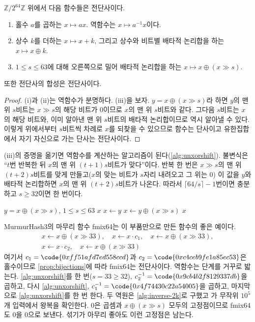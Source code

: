 \begin{proposition}
\label{prop:bijections}
$\mathbb{Z}/2^{64}\mathbb{Z}$ 위에서 다음 함수들은 전단사이다.
\begin{enumerate}
\item 홀수 $a$를 곱하는 $x\mapsto ax$. 역함수는 $x\mapsto a^{-1}x$이다.
\item 상수 $k$를 더하는 $x\mapsto x+k$, 그리고 상수와 비트별 배타적 논리합을 하는 $x\mapsto x\oplus k$.
\item $1\le s\le63$에 대해 오른쪽으로 밀어 배타적 논리합을 하는 $x\mapsto x\oplus(x\gg s)$.
\end{enumerate}
또한 전단사의 합성은 전단사이다.
\end{proposition}

\begin{proof}
(i)과 (ii)는 역함수가 분명하다. (iii)을 보자. $y=x\oplus(x\gg s)$라 하면 $y$의 맨 위 $s$비트는 $x\gg s$의 해당 비트가 $0$이므로 $x$의 맨 위 $s$비트와 같다. 그다음 $s$비트는 $x$의 해당 비트와, 이미 알아낸 맨 위 $s$비트의 배타적 논리합이므로 역시 알아낼 수 있다. 이렇게 위에서부터 $s$비트씩 차례로 $x$를 되찾을 수 있으므로 함수는 단사이고 유한집합에서 자기 자신으로 가는 단사는 전단사이다.
\end{proof}

(iii)의 증명을 옮기면 역함수를 계산하는 알고리즘이 된다(\cref{alg:unxorshift}). 불변식은 ``$t$번 반복한 뒤 $x$의 맨 위 $(t+1)s$비트가 맞다''이다. 반복 한 번은 $x\gg s$의 맨 위 $(t+2)s$비트를 맞게 만들고($x$의 맞는 비트가 $s$자리 내려오고 그 위는 $0$) 이 값을 $y$와 배타적 논리합하면 $x$의 맨 위 $(t+2)s$비트가 나온다. 따라서 $\lceil64/s\rceil-1$번이면 충분하고 $s\ge32$이면 한 번이다.

\begin{algorithm}[htbp]
\begin{algorithmic}[1]
\Require $y=x\oplus(x\gg s)$, $1\le s\le63$
\Ensure $x$
\State $x\gets y$ 
 $x\gets y\oplus(x\gg s)$ 
\EndFor
\State \Return $x$
\end{algorithmic}
\caption{오른쪽 밀기–배타적 논리합의 역함수}
\label{alg:unxorshift}
\end{algorithm}

MurmurHash3의 마무리 함수 fmix64는 이 부품만으로 만든 함수의 좋은 예이다\cite{appleby-smhasher}.
\begin{gather*}
x\gets x\oplus(x\gg33),\quad x\gets x\cdot c_1,\quad x\gets x\oplus(x\gg33),\\
x\gets x\cdot c_2,\quad x\gets x\oplus(x\gg33)
\end{gather*}
여기서 $c_1=\code{0xff51afd7ed558ccd}$과 $c_2=\code{0xc4ceb9fe1a85ec53}$은 홀수이므로 \cref{prop:bijections}에 따라 fmix64는 전단사이다. 역함수는 단계를 거꾸로 밟는다. \cref{alg:unxorshift}를 한 번($s=33\ge32$), $c_2^{-1}=\code{0x9cb4b2f8129337db}$을 곱하고, 다시 \cref{alg:unxorshift}, $c_1^{-1}=\code{0x4f74430c22a54005}$을 곱하고, 마지막으로 \cref{alg:unxorshift}를 한 번 한다. 두 역원은 \cref{alg:inverse-2k}로 구했고 가 무작위 $10^5$개 입력에서 왕복을 확인한다. $0$은 곱셈과 $x\oplus(x\gg s)$ 모두의 고정점이므로 fmix64도 $0$을 $0$으로 보낸다. 섞기가 아무리 좋아도 이런 고정점은 남는다.

